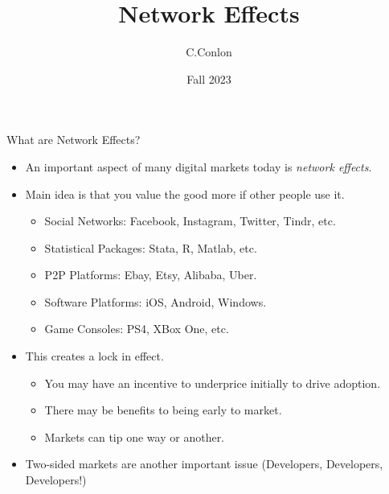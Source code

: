 \def\beamerclassoptions{[xcolor=pdftex,dvipsnames,table,mathserif,aspectratio=169]}


\usepackage[english]{babel}
\usepackage{pgf,pgfarrows,pgfnodes,pgfautomata,pgfheaps}
\usepackage{amsmath,amssymb,setspace}
\usepackage[latin1]{inputenc}
\usepackage[T1]{fontenc}
\usepackage{relsize}
\usepackage[absolute,overlay]{textpos} 
\newenvironment{reference}[2]{%
  \begin{textblock*}{\textwidth}(#1,#2) 
      \footnotesize\it\bgroup\color{red!50!black}}{\egroup\end{textblock*}} 



\title [Dynamic Oligopoly I]{Network Effects}
\author{C.Conlon }
\date{Fall 2023}


\begin{frame}
\titlepage
\end{frame}

\begin{frame}{What are Network Effects?}
\begin{itemize}
\item An important aspect of many digital markets today is \textit{network effects}.
\item Main idea is that you value the good more if other people use it.
\begin{itemize}
\item Social Networks: Facebook, Instagram, Twitter, Tindr, etc.
\item Statistical Packages: Stata, R, Matlab, etc.
\item P2P Platforms: Ebay, Etsy, Alibaba, Uber.
\item Software Platforms: iOS, Android, Windows.
\item Game Consoles: PS4, XBox One, etc.
\end{itemize}
\item This creates a \alert{lock in} effect.
\begin{itemize}
\item You may have an incentive to underprice initially to drive adoption.
\item There may be benefits to being early to market.
\item Markets can \alert{tip} one way or another.
\end{itemize}
\item Two-sided markets are another important issue (Developers, Developers, Developers!) 
\end{itemize}
\end{frame}


